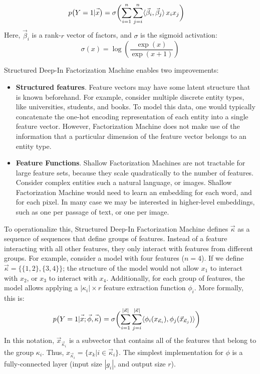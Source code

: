 \documentclass{article} %
\newcommand{\vect}[1]{\vec{#1}}
\begin{document}
\begin{align}
p\bigl(Y=1| \vect{\vphantom{\phi}x}  \bigr ) &= 
\sigma \biggl( 
                       \sum_{i =1}^{n} \sum_{j=i}^{n}  \langle  \vect{\beta}_i ,   \vect{\beta}_j  \rangle \, {x}_i {x}_j
  \biggr)
\end{align}
Here, $\vect{\beta}_i$ is a rank-$r$ vector of factors, and $\sigma$ is the sigmoid activation:
\begin{equation}
\sigma(x) = \log \left(\frac{\exp(x)}{\exp(x+1)} \right)
\end{equation}

Structured Deep-In Factorization Machine enables two improvements:
\begin{itemize}
\item \textbf{Structured features}.
Feature vectors  may have some latent structure that is known beforehand.
For example, consider multiple discrete entity types, like universities, students, and books.
To model this data, one would typically concatenate the one-hot encoding representation of each entity into a single feature vector. 
However, Factorization Machine does not make use of the information that a particular dimension of the feature vector belongs to an entity type.
\item \textbf{Feature Functions}. 
Shallow Factorization Machines are not tractable for large feature sets, because they scale quadratically to the number of features.
Consider complex entities such a natural language, or images. 
Shallow Factorization Machine would need to learn an embedding for each word, and for each pixel.
In many case we may be interested in higher-level embeddings, such as one per passage of text, or one per image.
\end{itemize}

To operationalize this, Structured Deep-In Factorization Machine defines $\vect{\kappa}$  as a sequence of sequences that define  groups of features. 
Instead of a feature interacting with all other features, they only interact with features from different groups.
For example, consider a model with four features ($n=4$).
If we define 
$
\vect{\kappa} = \{ \{1, 2 \}, \{ 3 , 4 \} \}
$;
the structure of the model would not allow $x_1$ to interact with $x_2$, or $x_3$ to interact with $x_4$.
Additionally, for each group of features, the model allows applying a $|\kappa_i| \times r $ feature extraction function $\phi_i$.
More formally, this is:
\begin{align}
p \bigl(Y=1| \vect{\vphantom{\phi}x};  \vect{\phi}, \vect{\vphantom{\phi}\kappa} \bigr ) &= 
\sigma \biggl( 
                       \sum_{i =1}^{|{\vect{\kappa}}|} \sum_{j=i}^{|{\vect{\kappa}}|}  \langle  \phi_i( {x}_{\vect{\kappa}_i}),  \phi_j( \vect{x}_{\vect{\kappa}_j}) \rangle
  \biggr)
\end{align}
In this notation, $\vect{x}_{\vect{\kappa}_i}$ is a subvector that contains all of the features that belong to the group $\kappa_i$.
Thus, $x_{\vect{\kappa}_i} =  \{ x_k | i \in \vect{\kappa}_i\}$. 
The simplest   implementation for $\phi$ is a fully-connected layer (input size  $|g_i|$, and output size $r$).
\end{document}
